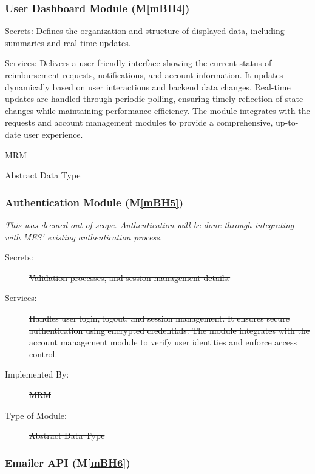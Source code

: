 \documentclass[12pt, titlepage]{article}
\newcommand{\mref}[1]{M\ref{#1}}
\begin{document}
\subsubsection{User Dashboard Module (\mref{mBH4})}

\begin{description}
\item{Secrets:} Defines the organization and structure of displayed data, including summaries and real-time updates.

\item{Services:} Delivers a user-friendly interface showing the current status of reimbursement requests, notifications, and account information. It updates dynamically based on user interactions and backend data changes. Real-time updates are handled through periodic polling, ensuring timely reflection of state changes while maintaining performance efficiency. The module integrates with the requests and account management modules to provide a comprehensive, up-to-date user experience.

\item[Implemented By:] MRM
\item[Type of Module:] Abstract Data Type
\end{description}

\subsubsection{Authentication Module (\mref{mBH5})}
\textit{This was deemed out of scope. Authentication will be done through integrating with MES' existing authentication process.}
\begin{description}
\item[Secrets:] \st{Validation processes, and session management details.}
\item[Services:] \st{Handles user login, logout, and session management. It ensures secure authentication using encrypted credentials. The module integrates with the account management module to verify user identities and enforce access control.}


\item[Implemented By:] \st{MRM}
\item[Type of Module:] \st{Abstract Data Type} 
\end{description}

\subsubsection{Emailer API (\mref{mBH6})}
\end{document}
